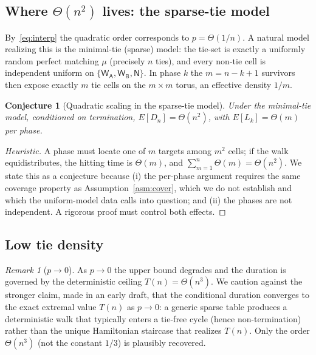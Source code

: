 \documentclass[11pt]{article}
\newtheorem{conjecture}{Conjecture}
\theoremstyle{definition}
\theoremstyle{remark}
\newtheorem{remark}{Remark}
\newcommand{\WA}{\mathsf{W_A}}
\newcommand{\WB}{\mathsf{W_B}}
\newcommand{\NN}{\mathsf{N}}
\begin{document}
\subsection{Where $\Theta(n^2)$ lives: the sparse-tie model}
By~\eqref{eq:interp} the quadratic order corresponds to $p = \Theta(1/n)$. A natural model realizing this is the
minimal-tie (sparse) model: the tie-set is exactly a uniformly random perfect matching $\mu$ (precisely $n$ ties), and
every non-tie cell is independent uniform on $\{\WA, \WB, \NN\}$. In phase $k$ the $m = n - k + 1$ survivors then expose
exactly $m$ tie cells on the $m \times m$ torus, an effective density $1/m$.

\begin{conjecture}[Quadratic scaling in the sparse-tie model]\label{conj:quad}
Under the minimal-tie model, conditioned on termination, $E[D_n] = \Theta(n^2)$, with $E[L_k] = \Theta(m)$ per phase.
\end{conjecture}
\begin{proof}[Heuristic]
A phase must locate one of $m$ targets among $m^2$ cells; if the walk equidistributes, the hitting time is $\Theta(m)$, and
$\sum_{m=1}^n \Theta(m) = \Theta(n^2)$. We state this as a conjecture because (i) the per-phase argument requires the same
coverage property as Assumption~\ref{asm:cover}, which we do not establish and which the uniform-model data calls into
question; and (ii) the phases are not independent. A rigorous proof must control both effects.
\end{proof}

\subsection{Low tie density}
\begin{remark}[$p \to 0$]
As $p \to 0$ the upper bound degrades and the duration is governed by the deterministic ceiling $T(n) = \Theta(n^3)$. We
caution against the stronger claim, made in an early draft, that the conditional duration converges to the exact extremal
value $T(n)$ as $p \to 0$: a generic sparse table produces a deterministic walk that typically enters a tie-free cycle
(hence non-termination) rather than the unique Hamiltonian staircase that realizes $T(n)$. Only the order $\Theta(n^3)$
(not the constant $1/3$) is plausibly recovered.
\end{remark}
\end{document}
